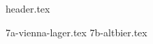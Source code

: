 \clearpage
{}
\divisorLine

{header.tex}

\begin{multicols}{2}

{7a-vienna-lager.tex}
{7b-altbier.tex}

\end{multicols}